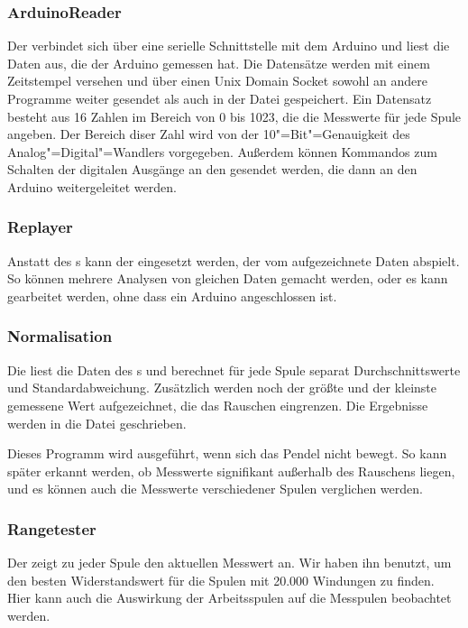 \subsubsection{ArduinoReader}
Der  verbindet sich über eine serielle Schnittstelle mit dem Arduino und liest die Daten aus, die der Arduino gemessen hat.
Die Datensätze werden mit einem Zeitstempel versehen und über einen Unix Domain Socket sowohl an andere Programme weiter gesendet als auch in der Datei  gespeichert.
Ein Datensatz besteht aus 16 Zahlen im Bereich von 0 bis 1023, die die Messwerte für jede Spule angeben.
Der Bereich diser Zahl wird von der 10"=Bit"=Genauigkeit des Analog"=Digital"=Wandlers vorgegeben.
Außerdem können Kommandos zum Schalten der digitalen Ausgänge an den  gesendet werden, die dann an den Arduino weitergeleitet werden.

\subsubsection{Replayer}
Anstatt des s kann der  eingesetzt werden, der vom  aufgezeichnete Daten abspielt.
So können mehrere Analysen von gleichen Daten gemacht werden, oder es kann gearbeitet werden, ohne dass ein Arduino angeschlossen ist.

\subsubsection{Normalisation}
Die  liest die Daten des s und berechnet für jede Spule separat Durchschnittswerte und Standardabweichung.
Zusätzlich werden noch der größte und der kleinste gemessene Wert aufgezeichnet, die das Rauschen eingrenzen.
Die Ergebnisse werden in die Datei  geschrieben.

Dieses Programm wird ausgeführt, wenn sich das Pendel nicht bewegt.
So kann später erkannt werden, ob Messwerte signifikant außerhalb des Rauschens liegen, und es können auch die Messwerte verschiedener Spulen verglichen werden.

\subsubsection{Rangetester}
Der  zeigt zu jeder Spule den aktuellen Messwert an.
Wir haben ihn benutzt, um den besten Widerstandswert für die Spulen mit 20.000 Windungen zu finden.
Hier kann auch die Auswirkung der Arbeitsspulen auf die Messpulen beobachtet werden.

